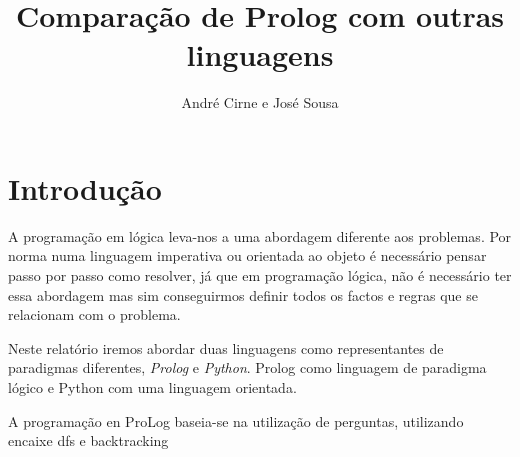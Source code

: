 \documentclass[12pt,a4paper]{report}
\author{André Cirne e José Sousa}
\title{Comparação de Prolog com outras linguagens}
\begin{document}
\maketitle
\tableofcontents
\section{Introdução}
A programação em lógica leva-nos a uma abordagem diferente aos problemas. Por norma numa linguagem imperativa ou orientada ao objeto é necessário pensar passo por passo como resolver, já que em programação lógica, não é necessário ter essa abordagem mas sim conseguirmos definir todos os factos e regras que se relacionam com o problema.

Neste relatório iremos abordar duas linguagens como representantes de paradigmas diferentes, \textit{Prolog} e \textit{Python}. Prolog como linguagem de paradigma lógico e Python com uma linguagem orientada.

A programação en ProLog baseia-se na utilização de perguntas, utilizando encaixe dfs e backtracking  	
\end{document}
